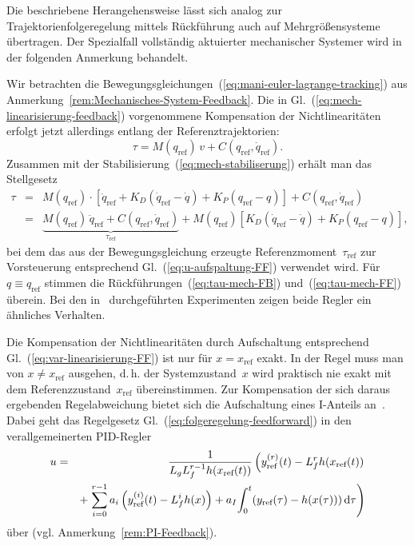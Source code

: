 Die beschriebene Herangehensweise lässt sich analog zur Trajektorienfolgeregelung
mittels Rückführung auch auf Mehrgrößensysteme übertragen. Der Spezialfall
vollständig aktuierter mechanischer Systemer wird in der folgenden
Anmerkung behandelt.
\begin{remark}
\label{rem:Mechanisches-System-Feedforward}Wir betrachten die Bewegungsgleichungen~(\ref{eq:mani-euler-lagrange-tracking})
aus Anmerkung~\ref{rem:Mechanisches-System-Feedback}. Die in Gl.~(\ref{eq:mech-linearisierung-feedback})
vorgenommene Kompensation der Nichtlinearitäten erfolgt jetzt allerdings
entlang der Referenztrajektorien:
\begin{equation}
\tau=M(q_{\text{ref}})\,v+C(q_{\text{ref}},\dot{q}_{\text{ref}}).\label{eq:mech-linearisierung-feedforward}
\end{equation}
Zusammen mit der Stabilisierung~(\ref{eq:mech-stabiliserung}) erhält
man das Stellgesetz
\begin{equation}
\begin{array}{lcl}
\tau & = & M(q_{\text{ref}})\cdot\left[\ddot{q}_{\text{ref}}+K_{D}\left(\dot{q}_{\text{ref}}-\dot{q}\right)+K_{P}\left(q_{\text{ref}}-q\right)\right]+C(q_{\text{ref}},\dot{q}_{\text{ref}})\\
 & = & \underbrace{M(q_{\text{ref}})\,\ddot{q}_{\text{ref}}+C(q_{\text{ref}},\dot{q}_{\text{ref}})}_{{\displaystyle \tau_{\text{ref}}}}+M(q_{\text{ref}})\left[K_{D}\left(\dot{q}_{\text{ref}}-\dot{q}\right)+K_{P}\left(q_{\text{ref}}-q\right)\right],
\end{array}\label{eq:tau-mech-FF}
\end{equation}
bei dem das aus der Bewegungsgleichung erzeugte Referenzmoment~$\tau_{\text{ref}}$
zur Vorsteuerung entsprechend Gl.~(\ref{eq:u-aufspaltung-FF}) verwendet
wird. Für $q\equiv q_{\text{ref}}$ stimmen die Rückführungen~(\ref{eq:tau-mech-FB})
und~(\ref{eq:tau-mech-FF}) überein. Bei den in~\cite{an1989} durchgeführten
Experimenten zeigen beide Regler ein ähnliches Verhalten.
\end{remark}

\begin{remark}
Die Kompensation der Nichtlinearitäten durch Aufschaltung entsprechend
Gl.~(\ref{eq:var-linearisierung-FF}) ist nur für $x=x_{\text{ref}}$
exakt. In der Regel muss man von $x\neq x_{\text{ref}}$ ausgehen,
d.\,h. der Systemzustand~$x$ wird praktisch nie exakt mit dem Referenzzustand~$x_{\text{ref}}$
übereinstimmen. Zur Kompensation der sich daraus ergebenden Regelabweichung
bietet sich die Aufschaltung eines I-Anteils an~\cite{hagenmeyer2003lncis,hagenmeyer2003}.
Dabei geht das Regelgesetz Gl.~(\ref{eq:folgeregelung-feedforward})
in den verallgemeinerten PID-Regler
\begin{eqnarray*}
u & = & \frac{1}{L_{g}L_{f}^{r-1}h(x_{\text{ref}}(t))}\left(y_{\text{ref}}^{(r)}(t)-L_{f}^{r}h(x_{\text{ref}}(t))\right.\\
 &  & +\left.\sum_{i=0}^{r-1}a_{i}\left(y_{\text{ref}}^{(i)}(t)-L_{f}^{i}h(x)\right)+a_{I}\!\int_{0}^{t}\!\left(y_{\text{ref}}(\tau)-h(x(\tau))\right){\mathrm{d}}\tau\right)
\end{eqnarray*}
über (vgl. Anmerkung~\ref{rem:PI-Feedback}).
\end{remark}

